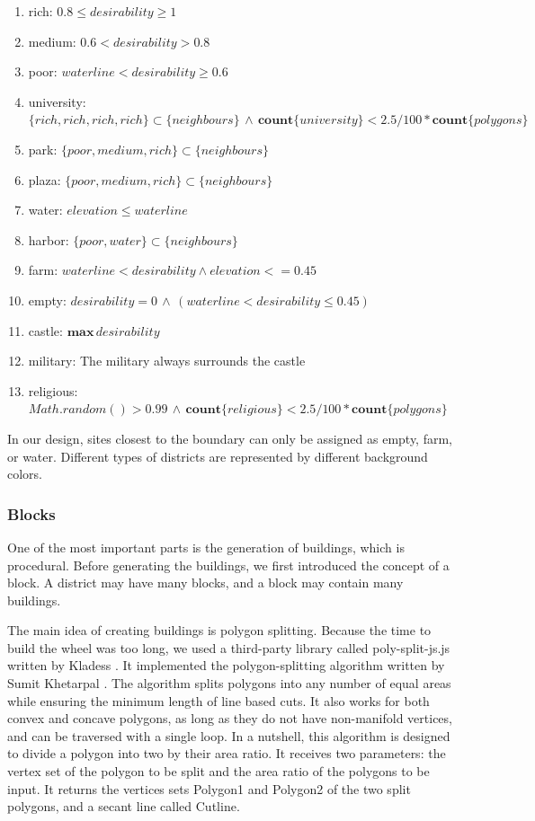 \begin{enumerate}
  \item rich: $0.8 \leq desirability \geq 1$
  \item medium: $0.6 < desirability > 0.8$
  \item poor: $waterline < desirability \geq 0.6$
  \item university: $\{rich, rich, rich, rich\} \subset \{neighbours\} \, \wedge \, \mathbf{count} \{university\} < 2.5 / 100 * \mathbf{count} \{polygons\}$
  \item park: $\{poor, medium, rich\} \subset \{neighbours\}$
  \item plaza: $\{poor, medium, rich\} \subset \{neighbours\}$
  \item water: $elevation \leq waterline$
  \item harbor: $\{poor, water\} \subset \{neighbours\}$
  \item farm: $waterline < desirability \wedge elevation <= 0.45$
  \item empty: $desirability = 0 \, \wedge \, (waterline < desirability \leq 0.45)$
  \item castle: $\mathbf{max}\,desirability$
  \item military: The military always surrounds the castle
  \item religious: $Math.random() > 0.99 \, \wedge \, \mathbf{count} \{religious\} < 2.5 / 100 * \mathbf{count} \{polygons\}$
\end{enumerate}

In our design, sites closest to the boundary can only be assigned as empty, farm, or water. Different types of districts are represented by different background colors.

\subsubsection{Blocks}
One of the most important parts is the generation of buildings, which is procedural. Before generating the buildings, we first introduced the concept of a block. A district may have many blocks, and a block may contain many buildings.

The main idea of creating buildings is polygon splitting. Because the time to build the wheel was too long, we used a third-party library called poly-split-js.js written by Kladess \cite{web:poly-split-js}. It implemented the polygon-splitting algorithm written by Sumit Khetarpal \cite{web:polygon-splitting}. The algorithm splits polygons into any number of equal areas while ensuring the minimum length of line based cuts. It also works for both convex and concave polygons, as long as they do not have non-manifold vertices, and can be traversed with a single loop. In a nutshell, this algorithm is designed to divide a polygon into two by their area ratio. It receives two parameters: the vertex set of the polygon to be split and the area ratio of the polygons to be input. It returns the vertices sets Polygon1 and Polygon2 of the two split polygons, and a secant line called Cutline.

